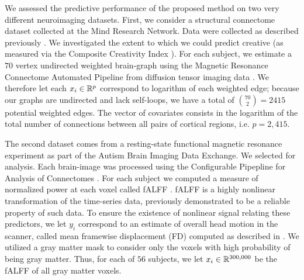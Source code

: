 We assessed the predictive performance of the proposed method on two very different neuroimaging datasets. First, we consider a structural connectome dataset collected at the Mind Research Network.  Data were collected as described previously \cite{??}.
We investigated the extent to which we could predict creative (as measured via the Composite Creativity Index \cite{Arden2010}).  
For each subject, we estimate a $70$ vertex undirected weighted brain-graph using the Magnetic Resonance Connectome Automated Pipeline \cite{MRCAP11} from diffusion tensor imaging data \cite{Mori2006}.
We therefore let each $x_i \in \mathbb{R}^p$ correspond to logarithm of each weighted edge; because our graphs are undirected and lack self-loops, we have a total of $\binom{70}{2}=2415$ potential weighted edges.
The vector of covariates consists in the  logarithm of the total number of connections between all pairs of cortical regions, i.e. $p=2,415$. 

The second dataset comes from a resting-state functional magnetic resonance experiment as part of the Autism Brain Imaging Data Exchange.  We selected  for analysis.  Each brain-image was processed using the Configurable Pipepline for Analysis of Connectomes \cite{cpac}. For each subject we computed a measure of normalized power at each voxel called fALFF \cite{Zou2008}.  fALFF is a highly nonlinear transformation of the time-series data, previously demonstrated to be a reliable property of such data.  To ensure the existence of nonlinear signal relating these predictors, we let $y_i$ correspond to an estimate of overall head motion in the scanner, called mean framewise displacement (FD) computed as described in \cite{power}.  We utilized a gray matter mask to consider only the voxels with high probability of being gray matter. Thus, for each of $56$ subjects, we let $x_i \in \mathbb{R}^{300,000}$ be the fALFF of all gray matter voxels.


